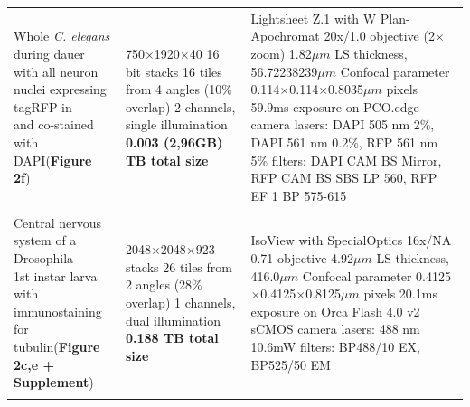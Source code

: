 \documentclass[]{spie}  %
\begin{document}
\begin{landscape}
{\begin{longtable}{lll}
                              \makecell[l]{Whole \emph{C. elegans} during dauer \\with all neuron nuclei expressing tagRFP in \\and co-stained with DAPI(\textbf{Figure 2f})} &  \makecell[l]{750$\times$1920$\times$40 16 bit stacks\\16 tiles from 4 angles (10\% overlap) \\2 channels, single illumination\\\textbf{0.003 (2,96GB) TB total size}}  &  \makecell[l]{Lightsheet Z.1 with W Plan-Apochromat 20x/1.0 objective (2$\times$ zoom)\\1.82$\mu{}m$ LS thickness, 56.72238239$\mu{}m$ Confocal parameter\\0.114$\times$0.114$\times$0.8035$\mu{}m$ pixels\\59.9ms exposure on PCO.edge camera\\lasers: DAPI 505 nm 2\%, DAPI 561 nm 0.2\%, RFP 561 nm 5\%\\filters: DAPI CAM BS Mirror, RFP CAM BS SBS LP 560, RFP EF 1 BP 575-615} \\ \\
                          \makecell[l]{Central nervous system of a Drosophila\\ 1st instar larva with immunostaining \\for tubulin(\textbf{Figure 2c,e + Supplement})} &                     \makecell[l]{2048$\times$2048$\times$923 stacks\\26 tiles from 2 angles (28\% overlap) \\1 channels, dual illumination\\\textbf{0.188 TB total size}}  &                                                                                                                \makecell[l]{IsoView with SpecialOptics 16x/NA 0.71 objective \\4.92$\mu{}m$ LS thickness, 416.0$\mu{}m$ Confocal parameter\\0.4125$\times$0.4125$\times$0.8125$\mu{}m$ pixels\\20.1ms exposure on Orca Flash 4.0 v2 sCMOS camera\\lasers: 488 nm 10.6mW\\filters: BP488/10 EX, BP525/50 EM } \\ \\
\end{longtable}}



\end{landscape}
\pagebreak
\end{document}
